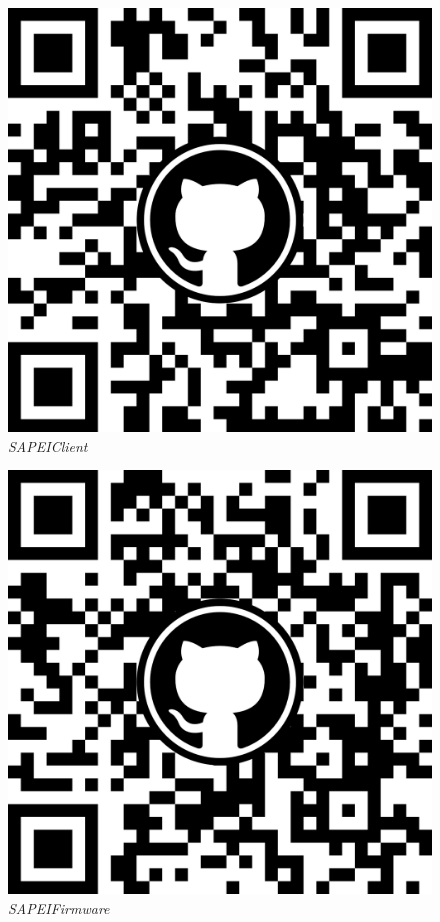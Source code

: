 \documentclass[a4paper, 12pt]{report}
\begin{document}
\begin{figure}[H]
\begin{minipage}{0.3\textwidth}
        \includegraphics[width=1\textwidth]{./client.png}
        \textit{SAPEIClient}
      \end{minipage}
      \hspace{0.5cm}
      \begin{minipage}{0.3\textwidth}
        \centering
        \includegraphics[width=1\textwidth]{./firmware.png}
        \textit{SAPEIFirmware}
      \end{minipage}
    \end{figure}
\end{document}
